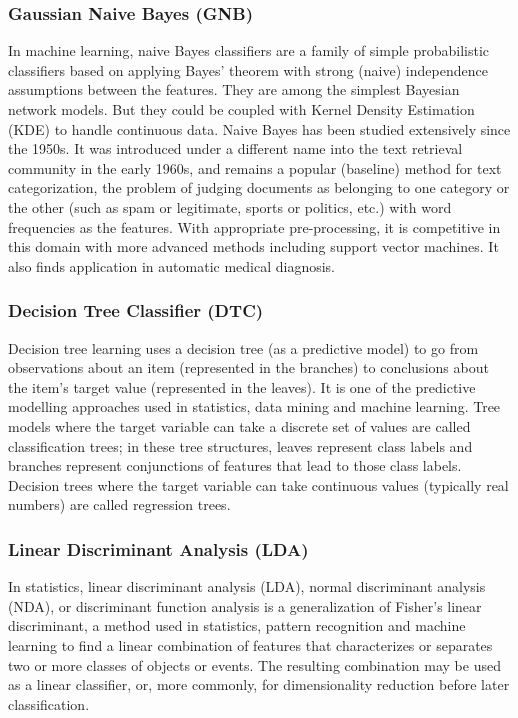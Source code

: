 	\subsubsection{Gaussian Naive Bayes (GNB)}
	In machine learning, naive Bayes classifiers are a family of simple probabilistic classifiers based on applying Bayes' theorem with strong (naive) independence assumptions between the features. They are among the simplest Bayesian network models. But they could be coupled with Kernel Density Estimation (KDE) to handle continuous data. Naive Bayes has been studied extensively since the 1950s. It was introduced under a different name into the text retrieval community in the early 1960s, and remains a popular (baseline) method for text categorization, the problem of judging documents as belonging to one category or the other (such as spam or legitimate, sports or politics, etc.) with word frequencies as the features. With appropriate pre-processing, it is competitive in this domain with more advanced methods including support vector machines. It also finds application in automatic medical diagnosis.
	
	\subsubsection{Decision Tree Classifier (DTC)}
	Decision tree learning uses a decision tree (as a predictive model) to go from observations about an item (represented in the branches) to conclusions about the item's target value (represented in the leaves). It is one of the predictive modelling approaches used in statistics, data mining and machine learning. Tree models where the target variable can take a discrete set of values are called classification trees; in these tree structures, leaves represent class labels and branches represent conjunctions of features that lead to those class labels. Decision trees where the target variable can take continuous values (typically real numbers) are called regression trees.
	
	\subsubsection{Linear Discriminant Analysis (LDA)}
	In statistics, linear discriminant analysis (LDA), normal discriminant analysis (NDA), or discriminant function analysis is a generalization of Fisher's linear discriminant, a method used in statistics, pattern recognition and machine learning to find a linear combination of features that characterizes or separates two or more classes of objects or events. The resulting combination may be used as a linear classifier, or, more commonly, for dimensionality reduction before later classification.


